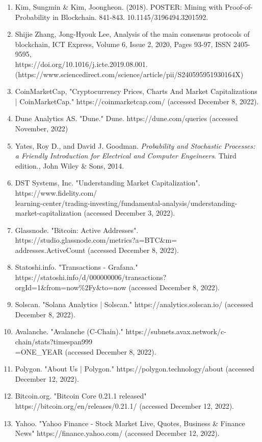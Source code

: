 \documentclass[12pt]{article}
\begin{document}
\begin{enumerate}
	\item Kim, Sungmin \& Kim, Joongheon. (2018). POSTER: Mining with Proof-of-Probability in Blockchain. 841-843. 10.1145/3196494.3201592. 
     \item Shijie Zhang, Jong-Hyouk Lee, Analysis of the main consensus protocols of blockchain, ICT Express, Volume 6, Issue 2, 2020, Pages 93-97, ISSN 2405-9595, \\https://doi.org/10.1016/j.icte.2019.08.001. \\(https://www.sciencedirect.com/science/article/pii/S240595951930164X)
	\item CoinMarketCap, "Cryptocurrency Prices, Charts And Market Capitalizations | CoinMarketCap." https://coinmarketcap.com/ (accessed December 8, 2022).
	\item Dune Analytics AS. "Dune." Dune. https://dune.com/queries (accessed November, 2022)
	\item Yates, Roy D., and David J. Goodman. \emph{Probability and Stochastic Processes: a Friendly Introduction for Electrical and Computer Engeineers}. Third edition., John Wiley \& Sons, 2014.
	\item DST Systems, Inc. "Understanding Market Capitalization". https://www.fidelity.com/\\learning-center/trading-investing/fundamental-analysis/understanding-market-capitalization (accessed December 3, 2022).
	\item Glassnode. "Bitcoin: Active Addresses". https://studio.glassnode.com/metrics?a=BTC\&m=\\addresses.ActiveCount (accessed December 8, 2022).
	\item Statoshi.info. "Transactions - Grafana." https://statoshi.info/d/000000006/transactions?\\orgId=1\&from=now\%2Fy\&to=now (accessed December 8, 2022).
	\item Solscan. "Solana Analytics | Solscan." https://analytics.solscan.io/ (accessed December 8, 2022).
	\item Avalanche. "Avalanche (C-Chain)." https://subnets.avax.network/c-chain/stats?timespan999\\=ONE\_YEAR (accessed December 8, 2022).
	\item Polygon. "About Us | Polygon." https://polygon.technology/about (accessed December 12, 2022).
	\item Bitcoin.org. "Bitcoin Core 0.21.1 released" https://bitcoin.org/en/releases/0.21.1/ (accessed December 12, 2022).
	\item Yahoo. "Yahoo Finance  - Stock Market Live, Quotes, Business \& Finance News" https://finance.yahoo.com/ (accessed December 12, 2022).
\end{enumerate}
\end{document}
